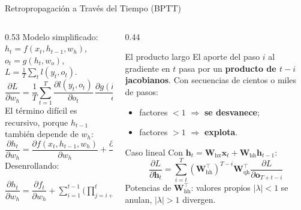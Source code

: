 \documentclass[aspectratio=169, 10pt]{beamer}
\newcommand{\W}[1]{\mathbf{W}_{\textrm{#1}}}
\newcommand{\formula}[1]{%
	\begin{tcolorbox}[colback=UCMBlue!8, colframe=UCMBlue, arc=4pt,
		boxsep=2pt, left=6pt, right=6pt, top=3pt, bottom=3pt]
		#1
	\end{tcolorbox}
}
\begin{document}
\begin{frame}{Retropropagaci\'on a Trav\'es del Tiempo (BPTT)}

	\begin{columns}[T]
		\begin{column}{0.53\textwidth}
			\small
			Modelo simplificado: $h_t = f(x_t, h_{t-1}, w_h)$, $o_t = g(h_t, w_o)$, $L = \frac{1}{T}\sum_t l(y_t, o_t)$.
			\[
				\frac{\partial L}{\partial w_h} = \frac{1}{T}\sum_{t=1}^{T}\frac{\partial l(y_t,o_t)}{\partial o_t}\,\frac{\partial g(h_t,w_o)}{\partial h_t}\,\frac{\partial h_t}{\partial w_h}
			\]
			El t\'ermino dif\'icil es recursivo, porque $h_{t-1}$ tambi\'en depende de $w_h$:
			\[
				\frac{\partial h_t}{\partial w_h} = \frac{\partial f(x_t,h_{t-1},w_h)}{\partial w_h} + \frac{\partial f(x_t,h_{t-1},w_h)}{\partial h_{t-1}}\,\frac{\partial h_{t-1}}{\partial w_h}
			\]
			Desenrollando:
			\formula{\small $\dfrac{\partial h_t}{\partial w_h} = \dfrac{\partial f_t}{\partial w_h} + \displaystyle\sum_{i=1}^{t-1}\Bigg(\prod_{j=i+1}^{t}\dfrac{\partial f_j}{\partial h_{j-1}}\Bigg)\dfrac{\partial f_i}{\partial w_h}$}
		\end{column}

		\begin{column}{0.44\textwidth}
			\begin{alertblock}{El producto largo}
				\small
				El aporte del paso $i$ al gradiente en $t$ pasa por un \textbf{producto de $t-i$ jacobianos}. Con secuencias de cientos o miles de pasos:
				\begin{itemize}
					\item factores $<1$ $\Rightarrow$ \textbf{se desvanece};
					\item factores $>1$ $\Rightarrow$ \textbf{explota}.
				\end{itemize}
			\end{alertblock}

			\begin{block}{Caso lineal}
				\small
				Con $\mathbf{h}_t = \W{hx}\mathbf{x}_t + \W{hh}\mathbf{h}_{t-1}$:
				\[
					\frac{\partial L}{\partial \mathbf{h}_t} = \sum_{i=t}^{T}\left(\W{hh}^\top\right)^{T-i}\W{qh}^\top\frac{\partial L}{\partial \mathbf{o}_{T+t-i}}
				\]
				Potencias de $\W{hh}^\top$: valores propios $|\lambda|<1$ se anulan, $|\lambda|>1$ divergen.
			\end{block}
		\end{column}
	\end{columns}

\end{frame}
\end{document}
